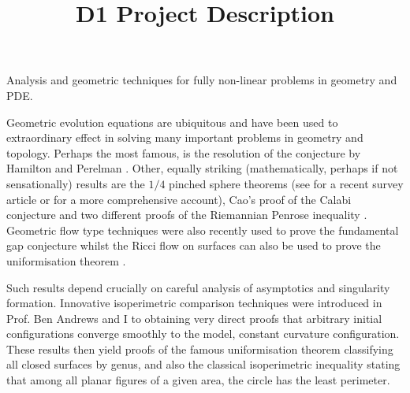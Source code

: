 \documentclass[12pt]{amsart}
\date{}
\title{D1 Project Description}
\renewcommand\maketitle{}
\begin{document}
\maketitle


\smallskip{}
\label{sec-1}
Analysis and geometric techniques for fully non-linear problems in geometry and PDE.

\smallskip{}
\label{sec-2}
Geometric evolution equations are ubiquitous and have been used to extraordinary effect in solving many important problems in geometry and topology.  Perhaps the most famous, is the resolution of the \poincare{} conjecture by Hamilton and Perelman \cite{MR2334563}.  Other, equally striking (mathematically, perhaps if not sensationally) results are the $1/4$ pinched sphere theorems (see \cite{MR2738904} for a recent survey article or \cite{MR2760593} for a more comprehensive account), Cao's proof of the Calabi conjecture \cite{MR799272} and two different proofs of the Riemannian Penrose inequality \cite{MR1916951, MR1908823}.  Geometric flow type techniques were also recently used to prove the fundamental gap conjecture \cite{MR2784332} whilst  the Ricci flow on surfaces can also be used to prove the uniformisation theorem \cite{MR2729306}.

Such results depend crucially on careful analysis of asymptotics and singularity formation. Innovative isoperimetric comparison techniques were introduced in \cite{MR2729306,MR2794630,MR2843240,pbthesis,Bryan} Prof. Ben Andrews and I to obtaining very direct proofs that arbitrary initial configurations converge smoothly to the model, constant curvature configuration. These results then yield proofs of the famous uniformisation theorem classifying all closed surfaces by genus, and also the classical isoperimetric inequality stating that among all planar figures of a given area, the circle has the least perimeter.
\end{document}
